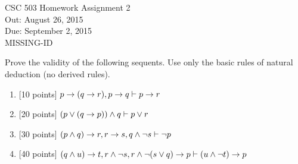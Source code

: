 \documentclass{article}
\def\unityid{MISSING-ID}
\begin{document}
\begin{center}
  {\LARGE CSC 503 Homework Assignment 2}\\[1pc]
  Out: August 26, 2015 \\
  Due: September 2, 2015 \\
  \unityid
\end{center}

Prove the validity of the following sequents.  Use only the basic
rules of natural deduction (no derived rules).

\begin{enumerate}

\item {[10 points]}
  $p \rightarrow (q \rightarrow r), p \rightarrow q \vdash p \rightarrow r$

\item {[20 points]} $(p \vee (q \rightarrow p)) \wedge q \vdash p \vee r$

\item {[30 points]}
  $(p \wedge q) \rightarrow r, r \rightarrow s, q \wedge \neg s \vdash \neg p$

\item {[40 points]}
  $(q \wedge u) \rightarrow t, r \wedge \neg s, r \wedge \neg(s \vee q)
  \rightarrow p \vdash (u \wedge \neg t) \rightarrow p$

\end{enumerate}
\end{document}

